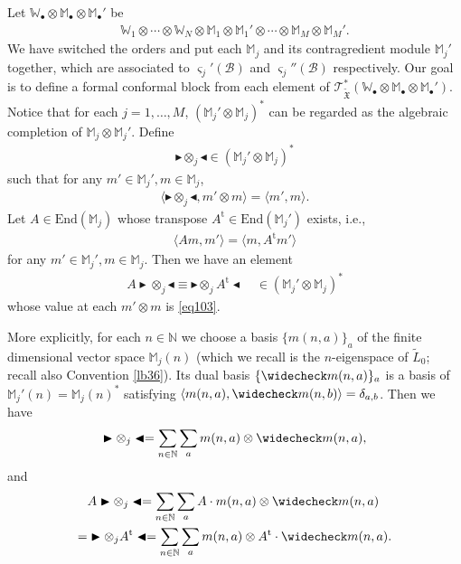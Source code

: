 \documentclass[12pt,a4paper,notitlepage]{report}
\theoremstyle{definition}
\theoremstyle{plain}
\newcommand{\fk}{\mathfrak}
\newcommand{\mc}{\mathcal}
\newcommand{\wtd}{\widetilde}
\newcommand{\wch}{\widecheck}
\newcommand{\tr}{\mathrm{t}} %
\newcommand{\End}{\mathrm{End}} %
\newcommand{\bk}[1]{\langle {#1}\rangle}
\newcommand{\scr}{\mathscr}
\newcommand{\sgm}{\varsigma}
\newcommand{\blt}{\bullet}
\newcommand{\Wbb}{\mathbb W}
\newcommand{\Mbb}{\mathbb M}
\newcommand{\Nbb}{\mathbb N}
\newcommand{\btl}{\blacktriangleleft}
\newcommand{\btr}{\blacktriangleright}
\numberwithin{equation}{section}
\begin{document}
Let $\Wbb_\blt\otimes \Mbb_\blt\otimes\Mbb_\blt'$ be
\begin{align}
\Wbb_1\otimes\cdots\otimes \Wbb_N\otimes\Mbb_1\otimes\Mbb_1'\otimes\cdots\otimes\Mbb_M\otimes\Mbb_M'.
\end{align}
We have switched the orders and put each $\Mbb_j$ and its contragredient module $\Mbb_j'$ together, which are associated to $\sgm_j'(\mc B)$ and $\sgm_j''(\mc B)$ respectively. Our goal is to define a formal conformal block from each element of $\scr T_{\wtd{\fk X}}^*(\Wbb_\blt\otimes \Mbb_\blt\otimes\Mbb_\blt')$. Notice that for each  $j=1,\dots,M$, $(\Mbb_j'\otimes\Mbb_j)^*$ can be regarded as the algebraic completion of $\Mbb_j\otimes\Mbb_j'$. Define \index{zzz@$\btr\otimes_j\btl$}
\begin{align*}
\btr\otimes_j\btl\in (\Mbb_j'\otimes\Mbb_j)^*
\end{align*}
such that for any $m'\in\Mbb_j',m\in\Mbb_j$,
\begin{align*}
\bk{\btr\otimes_j\btl,m'\otimes m}=\bk{m',m}.
\end{align*}
Let $A\in\End(\Mbb_j)$ whose transpose $A^\tr\in\End(\Mbb_j')$ exists, i.e.,
\begin{align}
\bk{Am,m'}=\bk{m,A^\tr m'}\label{eq103}
\end{align}
for any $m'\in\Mbb_j',m\in\Mbb_j$. Then we have an element
\begin{align}
A\btr\otimes_j\btl\equiv \btr\otimes_j A^\tr\btl\quad\in (\Mbb_j'\otimes\Mbb_j)^*\label{eq108}
\end{align}
whose value at each $m'\otimes m$ is \eqref{eq103}.


More explicitly, for each $n\in\Nbb$ we choose a basis $\{m(n,a)\}_a$ of the finite dimensional vector space $\Mbb_j(n)$ (which we recall is the $n$-eigenspace of $\wtd L_0$; recall also Convention \ref{lb36}). Its dual basis $\{\wch m(n,a)\}_a$ is a basis of $\Mbb_j'(n)=\Mbb_j(n)^*$ satisfying $\bk{m(n,a),\wch m(n,b)}=\delta_{a,b}$. Then we have
\begin{gather*}
\btr\otimes_j\btl=\sum_{n\in\Nbb}\sum_am(n,a)\otimes\wch m(n,a),
\end{gather*}
and
\begin{align*}
&A\btr\otimes_j\btl=\sum_{n\in\Nbb}\sum_a A\cdot m(n,a)\otimes\wch m(n,a)\\
=& \btr\otimes_j A^\tr\btl=\sum_{n\in\Nbb}\sum_am(n,a)\otimes A^\tr\cdot \wch m(n,a).
\end{align*}
\end{document}
